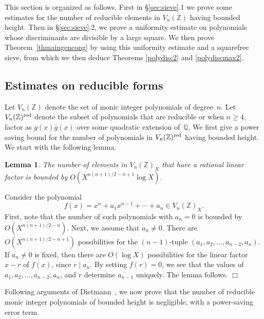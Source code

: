 \documentclass[11pt]{article}
\def\Z{{\mathbb Z}}
\def\red{{\rm red}}
\def\Q{{\mathbb Q}}
\def\Vmn{{V_n}}
\def\Z{{\mathbb Z}}
\def\Q{{\mathbb Q}}
\newtheorem{lemma}[theorem]{Lemma}
\newenvironment{proof}{\noindent {\bf Proof:}}{$\Box$ \vspace{2 ex}}
\begin{document}
This section is organized as follows. First in \S\ref{sec:sieve}.1 we
prove some estimates for the number of reducible elements in
$\Vmn(\Z)$ having bounded height.  Then in \S\ref{sec:sieve}.2, we
prove a uniformity estimate on polynomials whose discriminants are
divisible by a large square.  We then prove Theorem~\ref{thmaingencong} by
using this uniformity estimate and a squarefree sieve, from which we then deduce Theorems \ref{polydisc2} and
\ref{polydiscmax2}.


\subsection{Estimates on reducible forms}

Let $\Vmn(\Z)$ denote the set of monic integer polynomials of
degree~$n$. Let $\Vmn(\Z)^\red$ denote the subset of polynomials that
are reducible or when $n\geq 4$, factor as $g(x)\bar{g}(x)$ over some
quadratic extension of~$\Q$.   We first
give a power saving bound for the number of polynomials in
$\Vmn(\Z)^\red$ having bounded height. We start with the following
lemma.

\begin{lemma}\label{lemlin}
The number of elements in $\Vmn(\Z)_X$ that have a rational linear factor
is bounded by $O(X^{n(n+1)/2-n+1}\log X)$.
\end{lemma}
\begin{proof}
  Consider the polynomial
\begin{equation*}
  f(x)=x^n+a_{1}x^{n-1}+\cdots +a_n\in \Vmn(\Z)_X.
\end{equation*}
First, note that the number of such polynomials with $a_n=0$ is bounded
by $O(X^{n(n+1)/2-n})$. Next, we assume that $a_n\neq 0$. There are
$O(X^{n(n+1)/2-n+1})$ possibilities for the $(n-1)$-tuple
$(a_1,a_2,\ldots,a_{n-2},a_n)$. If $a_n\neq 0$ is fixed, then there
are $O(\log X)$ possibilities for the linear factor $x-r$ of $f(x)$,
since $r\mid a_n$. By setting $f(r)=0$, we see that the
values of $a_1,a_2,\ldots,a_{n-2},a_n$, and $r$ determine $a_{n-1}$
uniquely. The lemma follows.
\end{proof}

Following arguments of Dietmann~\cite{Dietmann}, we now prove that the number of reducible monic
integer polynomials of bounded height is negligible, with a power-saving error term.
\end{document}
